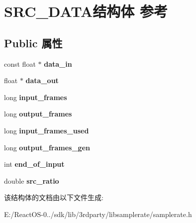 \hypertarget{struct_s_r_c___d_a_t_a}{}\section{S\+R\+C\+\_\+\+D\+A\+T\+A结构体 参考}
\label{struct_s_r_c___d_a_t_a}
\subsection*{Public 属性}
\begin{DoxyCompactItemize}
\item 
\mbox{\label{struct_s_r_c___d_a_t_a_ae81b5876c89aab03edd8f34471fb331d}} 
const float $\ast$ {\bfseries data\+\_\+in}
\item 
\mbox{\label{struct_s_r_c___d_a_t_a_a3d08a161dfb599f478efa8db7414c8a9}} 
float $\ast$ {\bfseries data\+\_\+out}
\item 
\mbox{\label{struct_s_r_c___d_a_t_a_a2b6fe0af73069250592190eece97a9ac}} 
long {\bfseries input\+\_\+frames}
\item 
\mbox{\label{struct_s_r_c___d_a_t_a_abfaea2234191264ea58b4a19da4fe8c3}} 
long {\bfseries output\+\_\+frames}
\item 
\mbox{\label{struct_s_r_c___d_a_t_a_accc338b0c6ec1074614dc4907fcc3bb1}} 
long {\bfseries input\+\_\+frames\+\_\+used}
\item 
\mbox{\label{struct_s_r_c___d_a_t_a_a86f13e5d832a6f2bf2ec451097b2c7f2}} 
long {\bfseries output\+\_\+frames\+\_\+gen}
\item 
\mbox{\label{struct_s_r_c___d_a_t_a_affc01ca4a99f3d15ab7c62da16b69eff}} 
int {\bfseries end\+\_\+of\+\_\+input}
\item 
\mbox{\label{struct_s_r_c___d_a_t_a_acaeb0a1991debfd736b4004f0c459530}} 
double {\bfseries src\+\_\+ratio}
\end{DoxyCompactItemize}


该结构体的文档由以下文件生成\+:\begin{DoxyCompactItemize}
\item 
E\+:/\+React\+O\+S-\/0../sdk/lib/3rdparty/libsamplerate/samplerate.\+h\end{DoxyCompactItemize}
